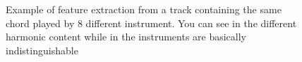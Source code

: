 \begin{figure}[t]
	\hfill
	\hfill
	\hfill
	\caption{Example of feature extraction from a track containing the same chord played by 8 different instrument. You can see in  the different harmonic content while in  the instruments are basically indistinguishable}
	\label{fig:exampleChromaToolbox}
\end{figure}
